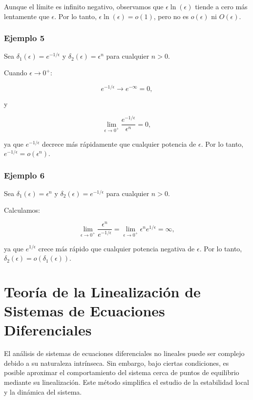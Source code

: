 \documentclass[12pt, a4paper]{report}
\begin{document}
Aunque el límite es infinito negativo, observamos que \(\epsilon \ln(\epsilon)\) tiende a cero más lentamente que \(\epsilon\). Por lo tanto, \(\epsilon \ln(\epsilon) = o(1)\), pero no es \(o\left( \epsilon \right)\) ni \(O\left( \epsilon \right)\).

\subsubsection*{Ejemplo 5}

Sea \(\delta_1(\epsilon) = e^{-1/\epsilon}\) y \(\delta_2(\epsilon) = \epsilon^n\) para cualquier \(n > 0\).

Cuando \(\epsilon \to 0^+\):

\[
e^{-1/\epsilon} \to e^{-\infty} = 0,
\]

y

\[
\lim_{\epsilon \to 0^+} \frac{e^{-1/\epsilon}}{\epsilon^n} = 0,
\]

ya que \(e^{-1/\epsilon}\) decrece más rápidamente que cualquier potencia de \(\epsilon\). Por lo tanto, \(e^{-1/\epsilon} = o\left( \epsilon^n \right)\).

\subsubsection*{Ejemplo 6}

Sea \(\delta_1(\epsilon) = \epsilon^n\) y \(\delta_2(\epsilon) = e^{-1/\epsilon}\) para cualquier \(n > 0\).

Calculamos:

\[
\lim_{\epsilon \to 0^+} \frac{\epsilon^n}{e^{-1/\epsilon}} = \lim_{\epsilon \to 0^+} \epsilon^n e^{1/\epsilon} = \infty,
\]

ya que \(e^{1/\epsilon}\) crece más rápido que cualquier potencia negativa de \(\epsilon\). Por lo tanto, \(\delta_2(\epsilon) = o\left( \delta_1(\epsilon) \right)\).

\newpage
 
\section{Teoría de la Linealización de Sistemas de Ecuaciones Diferenciales}

El análisis de sistemas de ecuaciones diferenciales no lineales puede ser complejo debido a su naturaleza intrínseca. Sin embargo, bajo ciertas condiciones, es posible aproximar el comportamiento del sistema cerca de puntos de equilibrio mediante su linealización. Este método simplifica el estudio de la estabilidad local y la dinámica del sistema.\\
\end{document}

